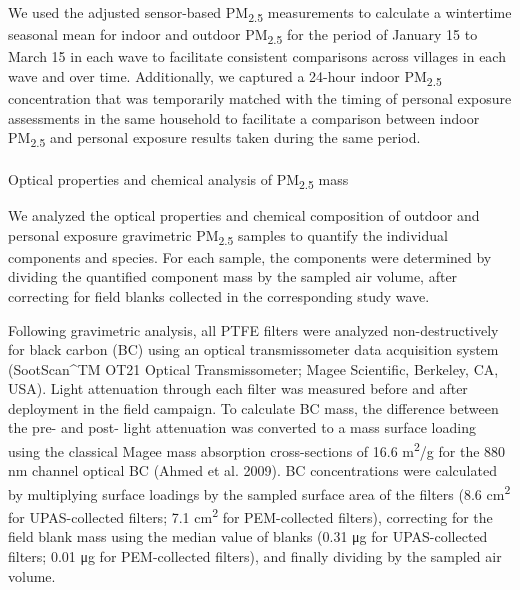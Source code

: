 \documentclass[
  letterpaper,
  DIV=11,
  numbers=noendperiod]{scrartcl}
\makeatletter
\let\oldparagraph\paragraph
\renewcommand{\paragraph}{
    \@ifstar
      \xxxParagraphStar
      \xxxParagraphNoStar
  }
\newcommand{\xxxParagraphStar}[1]{\oldparagraph*{#1}\mbox{}}
\newcommand{\xxxParagraphNoStar}[1]{\oldparagraph{#1}\mbox{}}
\makeatother
\begin{document}
We used  the adjusted sensor-based
PM\textsubscript{2.5} measurements to calculate a wintertime seasonal
mean for indoor and outdoor PM\textsubscript{2.5} for the period of
January 15 to March 15 in each wave to facilitate consistent comparisons
across villages in each wave and over time. Additionally, we captured a
24-hour indoor PM\textsubscript{2.5} concentration that was temporarily
matched with the timing of personal exposure assessments in the same
household to facilitate a comparison between indoor
PM\textsubscript{2.5} and personal exposure results taken during the
same period.

\paragraph{\texorpdfstring{Optical properties and chemical analysis of
PM\textsubscript{2.5}
mass}{Optical properties and chemical analysis of PM2.5 mass}}\label{optical-properties-and-chemical-analysis-of-pm2.5-mass}

We analyzed the optical properties and chemical composition of outdoor
and personal exposure gravimetric PM\textsubscript{2.5} samples to
quantify the individual components and species. For each sample, the
components were determined by dividing the quantified component mass by
the sampled air volume, after correcting for field blanks collected in
the corresponding study wave.

Following gravimetric analysis, all PTFE filters were analyzed
non-destructively for black carbon (BC) using an optical transmissometer
data acquisition system (SootScan\^{}TM OT21 Optical Transmissometer;
Magee Scientific, Berkeley, CA, USA). Light attenuation through each
filter was measured before and after deployment in the field campaign.
To calculate BC mass, the difference between the pre- and post- light
attenuation was converted to a mass surface loading using the classical
Magee mass absorption cross-sections of 16.6 m\textsuperscript{2}/g for
the 880 nm channel optical BC (Ahmed et al. 2009). BC concentrations
were calculated by multiplying surface loadings by the sampled surface
area of the filters (8.6 cm\textsuperscript{2} for UPAS-collected
filters; 7.1 cm\textsuperscript{2} for PEM-collected filters),
correcting for the field blank mass using the median value of blanks
(0.31 μg for UPAS-collected filters; 0.01 μg for PEM-collected filters),
and finally dividing by the sampled air volume.
\end{document}
